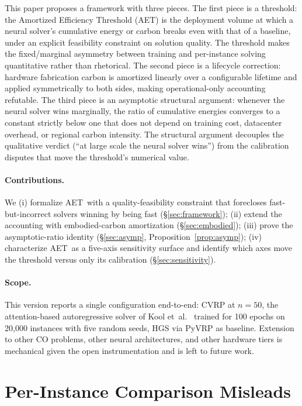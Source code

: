 \documentclass[11pt]{article}
\newcommand{\AET}{AET}
\begin{document}
This paper proposes a framework with three pieces. The first piece is a threshold: the Amortized Efficiency Threshold (\AET) is the deployment volume at which a neural solver's cumulative energy or carbon breaks even with that of a baseline, under an explicit feasibility constraint on solution quality. The threshold makes the fixed/marginal asymmetry between training and per-instance solving quantitative rather than rhetorical. The second piece is a lifecycle correction: hardware fabrication carbon is amortized linearly over a configurable lifetime and applied symmetrically to both sides, making operational-only accounting refutable. The third piece is an asymptotic structural argument: whenever the neural solver wins marginally, the ratio of cumulative energies converges to a constant strictly below one that does not depend on training cost, datacenter overhead, or regional carbon intensity. The structural argument decouples the qualitative verdict (``at large scale the neural solver wins'') from the calibration disputes that move the threshold's numerical value.

\paragraph{Contributions.} We
(i) formalize \AET\ with a quality-feasibility constraint that forecloses fast-but-incorrect solvers winning by being fast (\S\ref{sec:framework}); (ii) extend the accounting with embodied-carbon amortization (\S\ref{sec:embodied}); (iii) prove the asymptotic-ratio identity (\S\ref{sec:asymp}, Proposition~\ref{prop:asymp}); (iv) characterize \AET\ as a five-axis sensitivity surface and identify which axes move the threshold versus only its calibration (\S\ref{sec:sensitivity}).

\paragraph{Scope.} This version reports a single configuration end-to-end: CVRP at \(n=50\), the attention-based autoregressive solver of Kool et~al.~\cite{kool2019attention} trained for 100 epochs on 20{,}000 instances with five random seeds, HGS via PyVRP as baseline. Extension to other CO problems, other neural architectures, and other hardware tiers is mechanical given the open instrumentation and is left to future work.

\section{Per-Instance Comparison Misleads}
\label{sec:per-instance}
\end{document}
